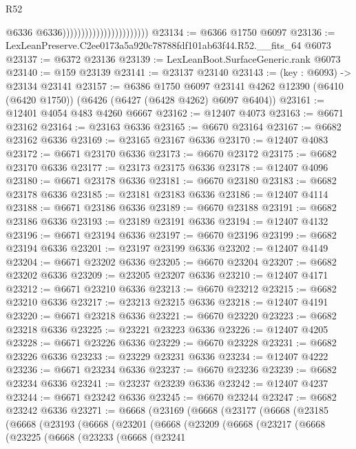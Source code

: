 \begin{lexlean}{R52}
\begin{coremodule}
                                                  @6336
                                                  @6336)))))))))))))))))))))))
@23134 := @6366 @1750 @6097
@23136 := LexLeanPreserve.C2ee0173a5a920c78788fdf101ab63f44.R52.__fits_64 @6073
@23137 := @6372 @23136
@23139 := LexLeanBoot.SurfaceGeneric.rank @6073
@23140 := @159 @23139
@23141 := @23137 @23140
@23143 := (key : @6093) -> @23134 @23141
@23157 := @6386
    @1750
    @6097
    @23141
    @4262
    @12390
    (@6410 (@6420 @1750))
    (@6426 (@6427 (@6428 @4262) @6097 @6404))
@23161 := @12401 @4054 @483 @4260 @6667
@23162 := @12407 @4073
@23163 := @6671 @23162
@23164 := @23163 @6336
@23165 := @6670 @23164
@23167 := @6682 @23162 @6336
@23169 := @23165 @23167 @6336
@23170 := @12407 @4083
@23172 := @6671 @23170 @6336
@23173 := @6670 @23172
@23175 := @6682 @23170 @6336
@23177 := @23173 @23175 @6336
@23178 := @12407 @4096
@23180 := @6671 @23178 @6336
@23181 := @6670 @23180
@23183 := @6682 @23178 @6336
@23185 := @23181 @23183 @6336
@23186 := @12407 @4114
@23188 := @6671 @23186 @6336
@23189 := @6670 @23188
@23191 := @6682 @23186 @6336
@23193 := @23189 @23191 @6336
@23194 := @12407 @4132
@23196 := @6671 @23194 @6336
@23197 := @6670 @23196
@23199 := @6682 @23194 @6336
@23201 := @23197 @23199 @6336
@23202 := @12407 @4149
@23204 := @6671 @23202 @6336
@23205 := @6670 @23204
@23207 := @6682 @23202 @6336
@23209 := @23205 @23207 @6336
@23210 := @12407 @4171
@23212 := @6671 @23210 @6336
@23213 := @6670 @23212
@23215 := @6682 @23210 @6336
@23217 := @23213 @23215 @6336
@23218 := @12407 @4191
@23220 := @6671 @23218 @6336
@23221 := @6670 @23220
@23223 := @6682 @23218 @6336
@23225 := @23221 @23223 @6336
@23226 := @12407 @4205
@23228 := @6671 @23226 @6336
@23229 := @6670 @23228
@23231 := @6682 @23226 @6336
@23233 := @23229 @23231 @6336
@23234 := @12407 @4222
@23236 := @6671 @23234 @6336
@23237 := @6670 @23236
@23239 := @6682 @23234 @6336
@23241 := @23237 @23239 @6336
@23242 := @12407 @4237
@23244 := @6671 @23242 @6336
@23245 := @6670 @23244
@23247 := @6682 @23242 @6336
@23271 := @6668
    (@23169
      (@6668
        (@23177
          (@6668
            (@23185
              (@6668
                (@23193
                  (@6668
                    (@23201
                      (@6668
                        (@23209
                          (@6668
                            (@23217
                              (@6668
                                (@23225
                                  (@6668
                                    (@23233
                                      (@6668
                                        (@23241

\end{coremodule}
\end{lexlean}
